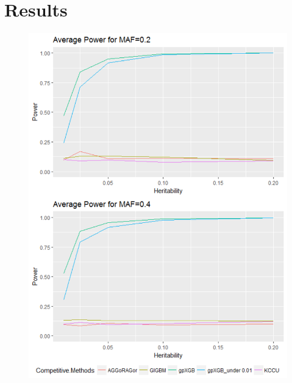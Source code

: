 \documentclass[11pt]{article}
\theoremstyle{plain}
\theoremstyle{definition}
\theoremstyle{remark}
\begin{document}
\section{Results}

\begin{figure}[H]
    \begin{center}
       \includegraphics[scale=0.5]{Rplot01}
    \end{center}
\end{figure}
\end{document}
